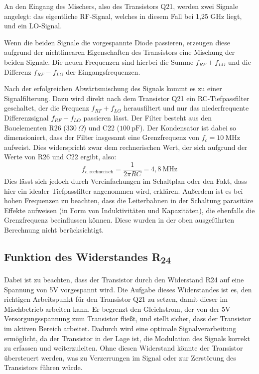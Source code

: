 An den Eingang des Mischers, also des Transistors Q21, werden zwei Signale angelegt: das eigentliche \ac{RF}-Signal, welches in diesem Fall bei 1,25 GHz liegt, und ein \ac{LO}-Signal.

Wenn die beiden Signale die vorgespannte Diode passieren, erzeugen diese aufgrund der nichtlinearen Eigenschaften des Transistors eine Mischung der beiden Signale. Die neuen Frequenzen sind hierbei die Summe $f_{RF} + f_{LO}$ und die Differenz $f_{RF} - f_{LO}$ der Eingangsfrequenzen. 

Nach der erfolgreichen Abwärtsmischung des Signals kommt es zu einer Signalfilterung. Dazu wird direkt nach dem Transistor Q21 ein RC-Tiefpassfilter geschaltet, der die Frequenz $f_{RF} + f_{LO}$ herausfiltert und nur das niederfrequente Differenzsignal $f_{RF} - f_{LO}$ passieren lässt. Der Filter besteht aus den Bauelementen R26 ($330~\Omega$) und C22 ($100~\mathrm{pF}$). Der Kondensator ist dabei so dimensioniert, dass der Filter insgesamt eine Grenzfrequenz von $f_{c} = 10~\mathrm{MHz}$ aufweist. Dies widerspricht zwar dem rechnerischen Wert, der sich aufgrund der Werte von R26 und C22 ergibt, also:
\begin{equation}
    f_{c, \text{rechnerisch}} = \frac{1}{2\pi R C} = 4{,}8~\mathrm{MHz}
\end{equation}
Dies lässt sich jedoch durch Vereinfachungen im Schaltplan oder den Fakt, dass hier ein idealer Tiefpassfilter angenommen wird, erklären. Außerdem ist es bei hohen Frequenzen zu beachten, dass die Leiterbahnen in der Schaltung parasitäre Effekte aufweisen (in Form von Induktivitäten und Kapazitäten), die ebenfalls die Grenzfrequenz beeinflussen können. Diese wurden in der oben ausgeführten Berechnung nicht berücksichtigt.

\subsection{Funktion des Widerstandes R\textsubscript{24}}
Dabei ist zu beachten, dass der Transistor durch den Widerstand R24 auf eine Spannung von 5V vorgespannt wird. Die Aufgabe dieses Widerstandes ist es, den richtigen Arbeitspunkt für den Transistor Q21 zu setzen, damit dieser im Mischbetrieb arbeiten kann. Er begrenzt den Gleichstrom, der von der 5V-Versorgungsspannung zum Transistor fließt, und stellt sicher, dass der Transistor im aktiven Bereich arbeitet. Dadurch wird eine optimale Signalverarbeitung ermöglicht, da der Transistor in der Lage ist, die Modulation des Signals korrekt zu erfassen und weiterzuleiten. Ohne diesen Widerstand könnte der Transistor übersteuert werden, was zu Verzerrungen im Signal oder zur Zerstörung des Transistors führen würde.


